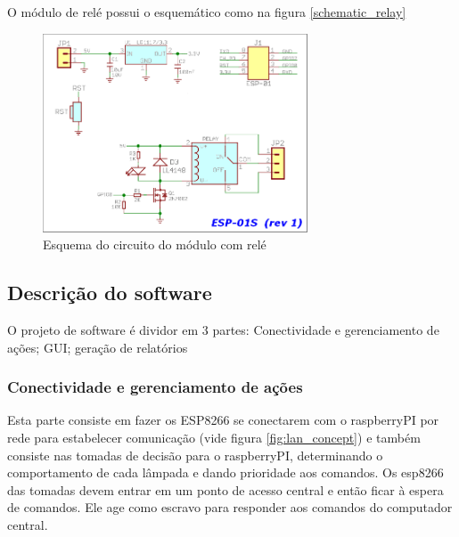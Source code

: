 \documentclass[11pt]{article}
\begin{document}
O módulo de relé possui o esquemático como na figura \ref{schematic_relay}
\begin{figure}[h!]
\caption{\label{fig:schematic_relay}Esquema do circuito do módulo com relé}
\centering
\includegraphics[width=0.7\textwidth]{./schematic_relay.png}
\end{figure}

\subsection{Descrição do software}
\label{sec:orge66c694}
O projeto de software é dividor em 3 partes: Conectividade e gerenciamento de ações; GUI; geração de relatórios
\subsubsection{Conectividade e gerenciamento de ações}
\label{sec:org5c59dbd}
Esta parte consiste em fazer os ESP8266 se conectarem com o raspberryPI por rede para estabelecer comunicação (vide figura \ref{fig:lan_concept}) e também consiste nas tomadas de decisão para o raspberryPI, determinando o comportamento de cada lâmpada e dando prioridade aos comandos.
Os esp8266 das tomadas devem entrar em um ponto de acesso central e então ficar à espera de comandos. Ele age como escravo para responder aos comandos do computador central.
\end{document}
